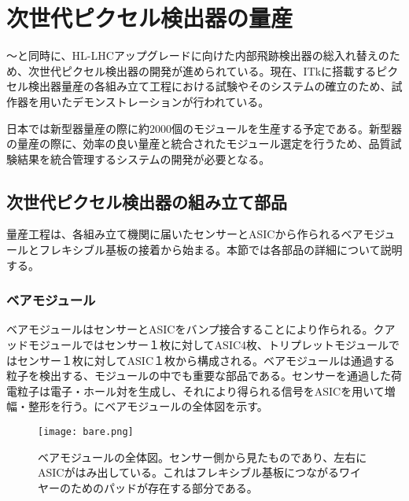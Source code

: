 \chapter{次世代ピクセル検出器の量産}
\label{sec:singatapixel-devel}
〜と同時に、HL-LHCアップグレードに向けた内部飛跡検出器の総入れ替えのため、次世代ピクセル検出器の開発が進められている。現在、ITkに搭載するピクセル検出器量産の各組み立て工程における試験やそのシステムの確立のため、試作器を用いたデモンストレーションが行われている。

日本では新型器量産の際に約$2000$個のモジュールを生産する予定である。新型器の量産の際に、効率の良い量産と統合されたモジュール選定を行うため、品質試験結果を統合管理するシステムの開発が必要となる。


\section{次世代ピクセル検出器の組み立て部品}
\label{sec:component}
量産工程は、各組み立て機関に届いたセンサーとASICから作られるベアモジュールとフレキシブル基板の接着から始まる。本節では各部品の詳細について説明する。


\subsection{ベアモジュール}
\label{sec:bare}

ベアモジュールはセンサーとASICをバンプ接合することにより作られる。クアッドモジュールではセンサー１枚に対してASIC4枚、トリプレットモジュールではセンサー１枚に対してASIC１枚から構成される。ベアモジュールは通過する粒子を検出する、モジュールの中でも重要な部品である。センサーを通過した荷電粒子は電子・ホール対を生成し、それにより得られる信号をASICを用いて増幅・整形を行う。にベアモジュールの全体図を示す。
\begin{figure}[tbp]
  \centering
  \texttt{[image: bare.png]}
  \caption[ベアモジュール]{ベアモジュールの全体図。センサー側から見たものであり、左右にASICがはみ出している。これはフレキシブル基板につながるワイヤーのためのパッドが存在する部分である。}
  \label{fig:bare}
\end{figure}

